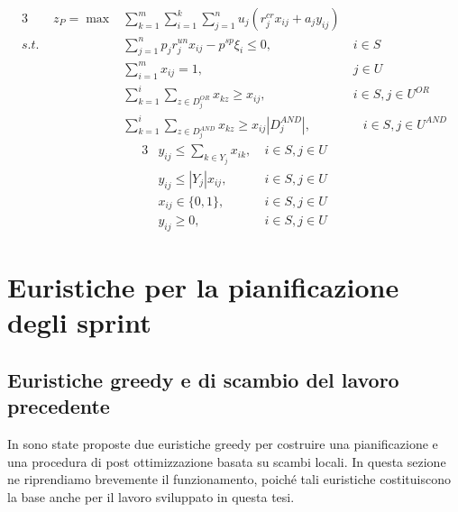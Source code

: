\documentclass[12pt,a4paper,openright,twoside]{book}
\begin{document}
\begin{alignat}{3}
 \qquad z_P  = \max  & \sum_{k=1}^m \sum_{i=1}^{k} \sum_{j=1}^{n} u_j \left( r_j^{cr} x_{ij} + a_j y_{ij} \right)
                                                                               &\                        \label{Eq5.P1}\\
  s.t.\ & \sum_{j=1}^{n} p_j r_j^{un} x_{ij} - p^{sp} \xi_{i}  \leq 0,                   &\ i \in S                \label{Eq5.P2}\\
        & \sum_{i=1}^{m} x_{ij} = 1,                                           &\ j \in U                \label{Eq5.P3}\\
        & \sum_{k=1}^{i} \sum_{z \in D_j^{OR}} x_{kz} \geq x_{ij},             &\ i \in S, j \in U^{OR}  \label{Eq5.P4}\\
        & \sum_{k=1}^{i} \sum_{z \in D_j^{AND}} x_{kz} \geq x_{ij}|D_j^{AND}|, &\quad i \in S, j \in U^{AND} \label{Eq5.P5}
\end{alignat}
\begin{alignat}{3}
        & y_{ij} \leq \sum_{k \in Y_j} x_{ik},                                 &\ i \in S, j \in U       \label{Eq5.P6}\\
        & y_{ij} \leq |Y_j| x_{ij},                                            &\ i \in S, j \in U       \label{Eq5.P7}\\
        & x_{ij} \in \{0,1\},                                                  &\ i \in S, j \in U       \label{Eq5.P8}\\
        & y_{ij} \geq 0,                                                       &\ i \in S, j \in U       \label{Eq5.P9}
\end{alignat}


\chapter{Euristiche per la pianificazione degli sprint}

\section{Euristiche greedy e di scambio del lavoro precedente}
\label{Sec.GreedyPrev}

In \cite{BOSCHETTI2014116} sono state proposte due euristiche greedy per costruire una pianificazione e una procedura di post ottimizzazione basata su scambi locali. In questa sezione ne riprendiamo brevemente il funzionamento, poiché tali euristiche costituiscono la base anche per il lavoro sviluppato in questa tesi.
\end{document}
